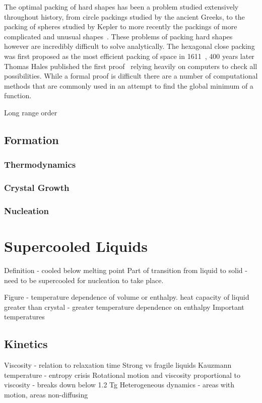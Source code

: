 The optimal packing of hard shapes has been a problem studied extensively throughout history, from circle packings studied by the ancient Greeks, to the packing of spheres studied by Kepler to more recently the packings of more complicated and unusual shapes~\cite{atkinson:12,torquato:12}. These problems of packing hard shapes however are incredibly difficult to solve analytically. The hexagonal close packing was first proposed as the most efficient packing of space in 1611~\cite{kepler:1611}, 400 years later Thomas Hales published the first proof~\cite{hales:05,hales:14} relying heavily on computers to check all possibilities. While a formal proof is difficult there are a number of computational methods that are commonly used in an attempt to find the global minimum of a function.


Long range order
\subsection{Formation}
\subsubsection{Thermodynamics}
\subsubsection{Crystal Growth}
\subsubsection{Nucleation}

\section{Supercooled Liquids}
Definition - cooled below melting point
Part of transition from liquid to solid - need to be supercooled for nucleation to take place.

Figure - temperature dependence of volume or enthalpy.
heat capacity of liquid greater than crystal - greater temperature dependence on enthalpy
Important temperatures

\subsection{Kinetics}
Viscosity - relation to relaxation time
Strong vs fragile liquids
Kauzmann temperature - entropy crisis
Rotational motion and viscosity proportional to viscosity - breaks down below 1.2 Tg
Heterogeneous dynamics - areas with motion, areas non-diffusing

